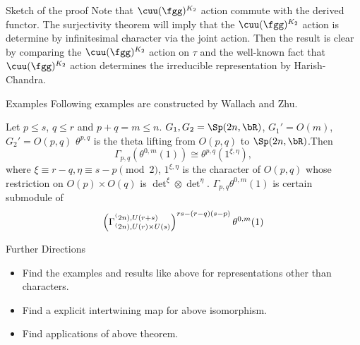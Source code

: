 \documentclass[final,hyperref={pdfpagelabels=false}]{beamer} %
\begin{document}
\begin{frame}
\begin{minipage}[t]{.48\linewidth}
\begin{block}{Sketch of the proof}
  Note that $\cuu(\fgg)^{K_2}$ action commute with the derived functor. 
  The surjectivity theorem will imply that the $\cuu(\fgg)^{K_2}$ action is determine by
  infinitesimal character via the joint action.
  Then the result is clear by  comparing the $\cuu(\fgg)^{K_2}$ action on $\tau$
  and the well-known fact that $\cuu(\fgg)^{K_2}$ action determines the 
  irreducible representation by Harish-Chandra.
\end{block}

\begin{block}{Examples}
      Following examples are constructed by Wallach and Zhu.

      Let $p\leq s$, $q\leq r$ and $p+q=m\leq n$.  
      $G_1,G_2 = \Sp(2n,\bR)$, $G_1' = O(m)$, $G_2'=O(p,q)$ 
      $\theta^{p,q}$ is the theta lifting from $O(p,q)$ to
      $\Sp(2n,\bR)$.Then 
      \[
      \displaystyle
      \Gamma_{p,q}(\theta^{0,m}(1)) \cong \theta^{p,q}(1^{\xi,\eta}),\]
      where $
      \xi \equiv r-q, \eta\equiv s-p \pmod{2}$,
      $1^{\xi,\eta}$ is the character of $O(p,q)$
      whose restriction on $O(p)\times O(q)$ is
      $\det^\xi\otimes \det^\eta$. 
      $\Gamma_{p,q}\theta^{0,m}(1)$ is certain submodule of
      \[
      \left(\Gamma_{\sp(2n),U(r)\times U(s)}^{\sp(2n),
          U(r+s)}\right)^{rs-(r-q)(s-p)}\theta^{0,m}(1)
      \]
    \end{block}
 
     \begin{block}{Further Directions}
       \begin{minipage}{\textwidth}
         \begin{itemize}
           \item Find the examples and results like above for representations other than characters.
           \item Find a explicit intertwining map for above isomorphism.
           \item Find applications of above theorem.
         \end{itemize}
       \end{minipage}
     \end{block}

     
%         

 \end{minipage}
 \end{frame}
\end{document}
